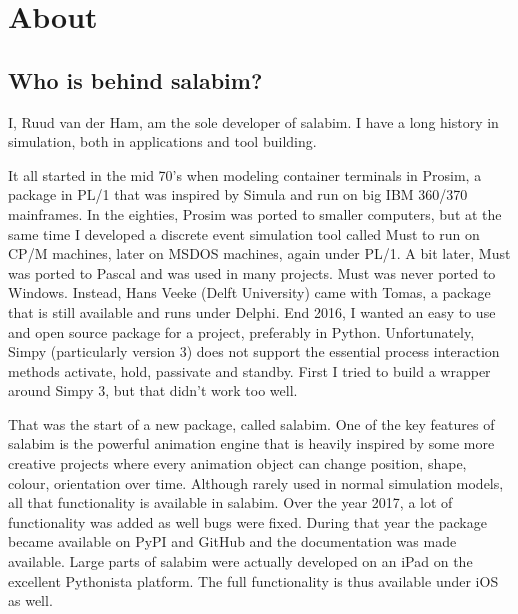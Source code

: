 \documentclass[letterpaper,10pt,english]{sphinxmanual}
\begin{document}
\chapter{About}
\label{\detokenize{About:about}}\label{\detokenize{About::doc}}

\section{Who is behind salabim?}
\label{\detokenize{About:who-is-behind-salabim}}
I, Ruud van der Ham, am the sole developer of salabim. I have a long history in simulation, both in
applications and tool building.

It all started in the mid 70’s when modeling container terminals in Prosim, a package
in PL/1 that was inspired by Simula and run on big IBM 360/370 mainframes. 
In the eighties, Prosim was ported to smaller computers, but at the same time I
developed a discrete event simulation tool called Must to run on CP/M machines, later
on MSDOS machines, again under PL/1. A bit later, Must was ported to Pascal and was
used in many projects. Must was never ported to Windows. Instead, Hans Veeke (Delft University)
came with Tomas, a package that is still available and runs under Delphi. 
End 2016, I wanted an easy to use and open source package for a project, preferably
in Python. Unfortunately, Simpy (particularly version 3) does not support the essential
process interaction methods activate, hold, passivate and standby. First I tried to
build a wrapper around Simpy 3, but that didn’t work too well.

That was the start of a new package, called salabim.
One of the key features of salabim is the powerful animation engine that is heavily
inspired by some more creative projects where every animation object can change position,
shape, colour, orientation over time. Although rarely used in normal simulation models,
all that functionality is available in salabim. 
Over the year 2017, a lot of functionality was added as well bugs were fixed. During that year
the package became available on PyPI and GitHub and the documentation was made available. 
Large parts of salabim were actually developed on an iPad on the excellent Pythonista platform. The full
functionality is thus available under iOS as well.
\end{document}
